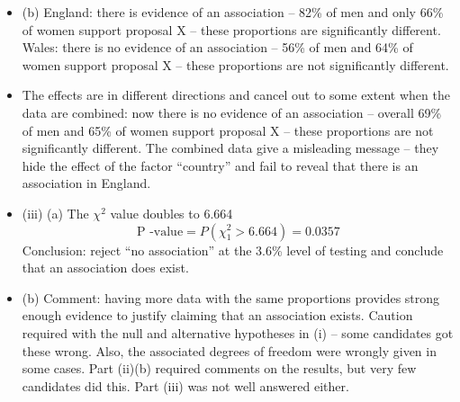 \documentclass[a4paper,12pt]{article}
\begin{document}
\begin{itemize}
\item (b)
England: there is evidence of an association – 82\% of men and only 66\% of women support proposal X – these proportions are
significantly different.
Wales: there is no evidence of an association – 56\% of men and 64\% of women support proposal X – these proportions are not significantly different.
\item The effects are in different directions and cancel out to some extent when the data are combined: now there is no evidence of an
association – overall 69\% of men and 65\% of women support proposal
X – these proportions are not significantly different.
The combined data give a misleading message – they hide the effect of the factor “country” and fail to reveal that there is an association in England.
\item (iii)
(a)
The $\chi^2$ value doubles to 6.664
\[\mbox{P -value} = P ( \chi^{2}_{1} > 6.664) = 0.0357\]
Conclusion: reject “no association” at the 3.6\% level of testing and
conclude that an association does exist.
\item (b)
Comment: having more data with the same proportions provides strong enough evidence to justify claiming that an association exists.
Caution required with the null and alternative hypotheses in (i) – some candidates got these wrong. Also, the associated degrees of freedom were wrongly given in some cases. Part (ii)(b) required comments on the results, but very few candidates did this. Part (iii) was not well answered either.
\end{itemize}
\end{document}
